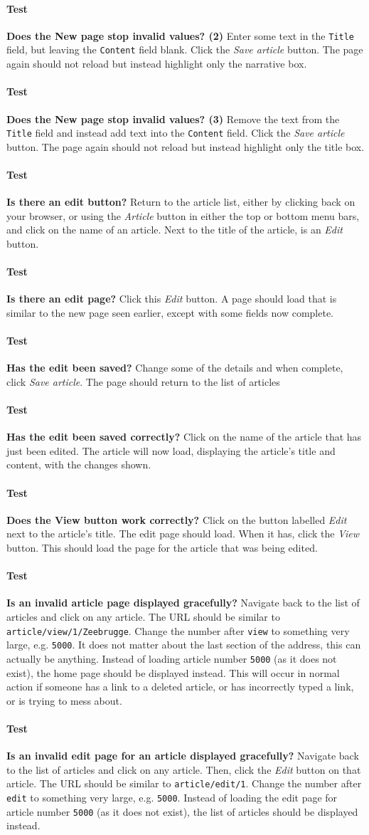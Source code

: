 \documentclass[12pt]{article}
\newcounter{Test}
\newcommand{\test}[1]{%
\stepcounter{Test}%
\paragraph{Test \theTest} \textbf{#1} }
\begin{document}
\test{Does the New page stop invalid values? (2)}
Enter some text in the \texttt{Title} field, but leaving the \texttt{Content} field blank. Click the \textit{Save article} button. The page again should not reload but instead highlight only the narrative box.

\test{Does the New page stop invalid values? (3)}
Remove the text from the \texttt{Title} field and instead add text into the \texttt{Content} field. Click the \textit{Save article} button. The page again should not reload but instead highlight only the title box.

\test{Is there an edit button?}
Return to the article list, either by clicking back on your browser, or using the \textit{Article} button in either the top or bottom menu bars, and click on the name of an article. Next to the title of the article, is an \textit{Edit} button.

\test{Is there an edit page?}
Click this \textit{Edit} button. A page should load that is similar to the new page seen earlier, except with some fields now complete.

\test{Has the edit been saved?}
Change some of the details and when complete, click \textit{Save article}. The page should return to the list of articles

\test{Has the edit been saved correctly?}
Click on the name of the article that has just been edited. The article will now load, displaying the article's title and content, with the changes shown.

\test{Does the View button work correctly?}
Click on the button labelled \textit{Edit} next to the article's title. The edit page should load. When it has, click the \textit{View} button. This should load the page for the article that was being edited.

\test{Is an invalid article page displayed gracefully?}
Navigate back to the list of articles and click on any article. The URL should be similar to \texttt{article/view/1/Zeebrugge}. Change the number after \texttt{view} to something very large, e.g. \texttt{5000}. It does not matter about the last section of the address, this can actually be anything. Instead of loading article number \texttt{5000} (as it does not exist), the home page should be displayed instead. This will occur in normal action if someone has a link to a deleted article, or has incorrectly typed a link, or is trying to mess about.

\test{Is an invalid edit page for an article displayed gracefully?}
Navigate back to the list of articles and click on any article. Then, click the \textit{Edit} button on that article. The URL should be similar to \texttt{article/edit/1}. Change the number after \texttt{edit} to something very large, e.g. \texttt{5000}. Instead of loading the edit page for article number \texttt{5000} (as it does not exist), the list of articles should be displayed instead.
\end{document}
